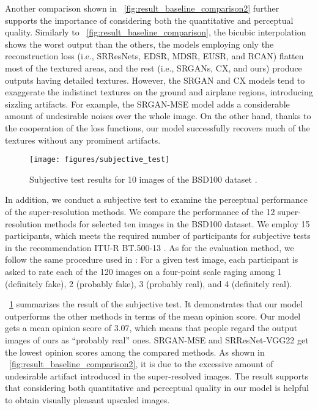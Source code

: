 \documentclass[runningheads]{llncs}
\begin{document}
Another comparison shown in \figurename~\ref{fig:result_baseline_comparison2} further supports the importance of considering both the quantitative and perceptual quality.
Similarly to \figurename~\ref{fig:result_baseline_comparison}, the bicubic interpolation shows the worst output than the others, the models employing only the reconstruction loss (i.e., SRResNets, EDSR, MDSR, EUSR, and RCAN) flatten most of the textured areas, and the rest (i.e., SRGANs, CX, and ours) produce outputs having detailed textures.
However, the SRGAN and CX models tend to exaggerate the indistinct textures on the ground and airplane regions, introducing sizzling artifacts.
For example, the SRGAN-MSE model adds a considerable amount of undesirable noises over the whole image.
On the other hand, thanks to the cooperation of the loss functions, our model successfully recovers much of the textures without any prominent artifacts.


\begin{figure}[t]
	\centering
	\texttt{[image: figures/subjective\_test]}
	\caption{Subjective test results for 10 images of the BSD100 dataset \cite{martin2001database}.}
	\label{fig:subjective_test}
\end{figure}


In addition, we conduct a subjective test to examine the perceptual performance of the super-resolution methods.
We compare the performance of the 12 super-resolution methods for selected ten images in the BSD100 dataset.
We employ 15 participants, which meets the required number of participants for subjective tests in the recommendation ITU-R BT.500-13 \cite{union2012recommendation}.
As for the evaluation method, we follow the same procedure used in \cite{blau20182018}: For a given test image, each participant is asked to rate each of the 120 images on a four-point scale raging among 1 (definitely fake), 2 (probably fake), 3 (probably real), and 4 (definitely real).

\figurename~\ref{fig:subjective_test} summarizes the result of the subjective test.
It demonstrates that our model outperforms the other methods in terms of the mean opinion score.
Our model gets a mean opinion score of 3.07, which means that people regard the output images of ours as ``probably real'' ones.
SRGAN-MSE and SRResNet-VGG22 get the lowest opinion scores among the compared methods.
As shown in \figurename~\ref{fig:result_baseline_comparison2}, it is due to the excessive amount of undesirable artifact introduced in the super-resolved images.
The result supports that considering both quantitative and perceptual quality in our model is helpful to obtain visually pleasant upscaled images.
\end{document}
